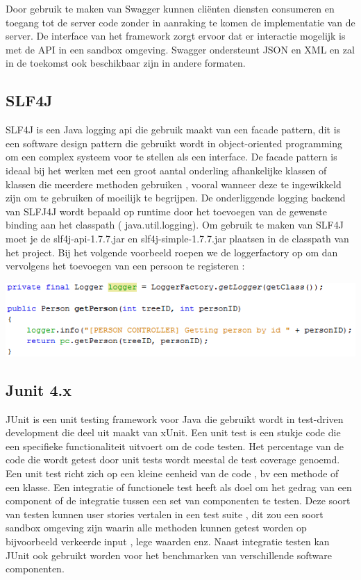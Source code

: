 \documentclass[pdftex,a4paper,12pt,twoside]{report}
\begin{document}
Door gebruik te maken van Swagger kunnen cliënten diensten consumeren en toegang tot de server code zonder in aanraking te komen de implementatie van de server.
De interface van het framework zorgt ervoor dat er interactie mogelijk is  met de API in een sandbox omgeving.
Swagger ondersteunt JSON en XML en zal in de toekomst ook beschikbaar zijn in andere formaten.

\subsection{SLF4J}
SLF4J is een Java logging api die gebruik maakt van een facade pattern, dit is een software design pattern die gebruikt wordt in object-oriented programming om een complex systeem voor te stellen als een interface.
De facade pattern is ideaal bij het werken met een groot aantal onderling afhankelijke klassen of klassen die meerdere methoden gebruiken , vooral wanneer deze te ingewikkeld zijn om te gebruiken of moeilijk te begrijpen.
De onderliggende logging backend van SLFJ4J wordt bepaald op runtime door het toevoegen van de gewenste binding aan het classpath ( java.util.logging).
Om gebruik te maken van SLF4J moet je de slf4j-api-1.7.7.jar en slf4j-simple-1.7.7.jar plaatsen in de classpath van het project.
Bij het volgende voorbeeld roepen we de loggerfactory op om dan vervolgens het toevoegen van een persoon te registeren :


\includegraphics{images/logger.png}\\


\subsection{Junit 4.x}
JUnit is een unit testing framework voor Java die gebruikt wordt in test-driven development die deel uit maakt van xUnit.
Een unit test is een stukje code die een specifieke functionaliteit uitvoert om de code testen. Het percentage van de code die wordt getest door unit tests wordt meestal de test coverage genoemd.
Een unit test richt zich op een kleine eenheid van de code , bv een methode of een klasse.
Een integratie of functionele test heeft als doel om het gedrag van een component of de integratie tussen een set van componenten te testen.
Deze soort van testen kunnen user stories vertalen in een test suite , dit zou een soort sandbox omgeving zijn waarin alle methoden kunnen getest worden op bijvoorbeeld verkeerde input , lege waarden enz.
Naast integratie testen kan JUnit ook gebruikt worden voor het benchmarken van verschillende software componenten.
\end{document}
